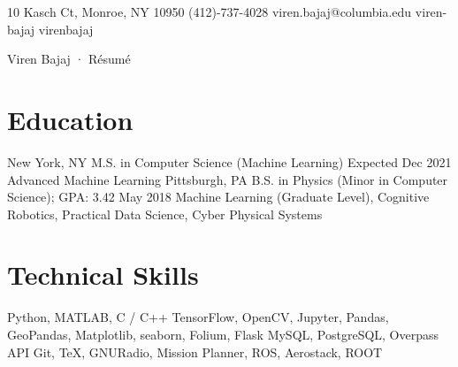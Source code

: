 \documentclass[11pt, letterpaper]{simple_resume}[2020/07/29]
\begin{document}
           {10 Kasch Ct, Monroe, NY 10950} %
           {(412)-737-4028} %
           {viren.bajaj@columbia.edu} %
           {viren-bajaj} %
           {virenbajaj} %

\makefooter{\today}
          {Viren Bajaj · Résumé}
          {\thepage}
\section{Education}
               {New York, NY} %
               {M.S. in Computer Science (Machine Learning)} %
               {Expected Dec 2021} %
               {Advanced Machine Learning} %
\vspace{-1ex}               
               {Pittsburgh, PA} %
               {B.S. in Physics (Minor in Computer Science); GPA: 3.42} %
               {May 2018} %
               {Machine Learning (Graduate Level), Cognitive Robotics, Practical Data Science, Cyber Physical Systems} %

\section{Technical Skills}

\begin{skills}
      {Python, MATLAB, C / C++}
      {TensorFlow, OpenCV, Jupyter, Pandas, GeoPandas,                             Matplotlib, seaborn, Folium, Flask}
       {MySQL, PostgreSQL, Overpass API}
     {Git, \TeX, GNURadio, Mission Planner, ROS, Aerostack,                             ROOT}
\end{skills}
\end{document}
